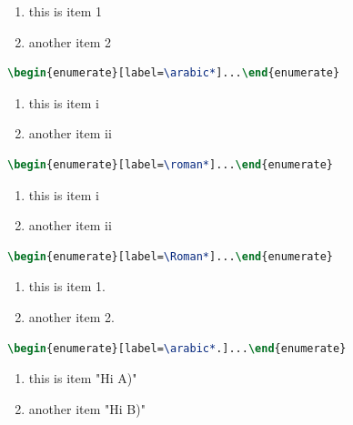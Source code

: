 \documentclass{article}				%
\begin{document}
\begin{enumerate}[label=\arabic*]
	\item this is item 1
	\item another item 2
\end{enumerate}

\begin{lstlisting}[language=tex,frame=single]
\begin{enumerate}[label=\arabic*]...\end{enumerate}
\end{lstlisting}

\begin{enumerate}[label=\roman*]
	\item this is item i
	\item another item ii
\end{enumerate}

\begin{lstlisting}[language=tex,frame=single]
\begin{enumerate}[label=\roman*]...\end{enumerate}
\end{lstlisting}

\begin{enumerate}[label=\Roman*]
	\item this is item i
	\item another item ii
\end{enumerate}

\begin{lstlisting}[language=tex,frame=single]
\begin{enumerate}[label=\Roman*]...\end{enumerate}
\end{lstlisting}


\begin{enumerate}[label=\arabic*.]
	\item this is item 1.
	\item another item 2.
\end{enumerate}

\begin{lstlisting}[language=tex,frame=single]
\begin{enumerate}[label=\arabic*.]...\end{enumerate}
\end{lstlisting}

\begin{enumerate}[label=Hi \Alph*)]
	\item this is item "Hi A)"
	\item another item "Hi B)"
\end{enumerate}
\end{document}

